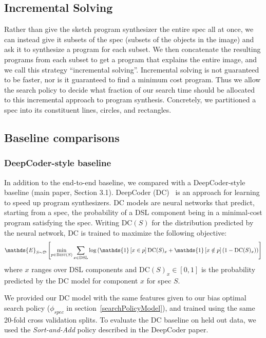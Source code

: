 \documentclass{article}
\newcommand{\indicator}{\mathds{1}} %
\newcommand{\expect}{\mathds{E}} %
\begin{document}
\subsection{Incremental Solving}
Rather than give the sketch program synthesizer the entire spec all at once,
we can instead give it subsets of the spec (subsets of the objects in the image)
and ask it to synthesize a program for each subset.
We then concatenate the resulting programs from each subset to get a program that explains the entire image,
and we call this strategy ``incremental solving''.
Incremental solving is not guaranteed to be faster,
nor is it guaranteed to find a minimum cost program.
Thus we allow the search policy to decide
what fraction of our search time should be allocated to this incremental approach to program synthesis.
Concretely, we partitioned a spec into its constituent lines, circles, and rectangles.
\subsection{Baseline comparisons}

\subsubsection{DeepCoder-style baseline}

In addition to the end-to-end baseline,
we compared with a DeepCoder-style baseline (main paper, Section 3.1).
DeepCoder (DC)~\cite{BalGauBroetal16}
is an approach for learning to speed up program synthesizers.
DC models are neural networks that
predict, starting from a spec,
the probability of a DSL component being in a minimal-cost program satisfying the spec.
Writing $\text{DC}(S)$ for the distribution predicted by the neural network,
DC is trained to maximize  the following objective:
\begin{equation}
  \expect_{S\sim\mathcal{D}}\left[\min_{p\in \text{\textsc{Best}}(S)} \sum_{x\in \text{DSL}} \log \left(\indicator\left[x\in p \right] \text{DC}(S)_x + \indicator\left[x\notin p \right] (1 - \text{DC}(S)_x)\right)
    \right]
\end{equation}
where $x$ ranges over DSL components and $\text{DC}(S)_x\in \left[0,1 \right]$  is the probability predicted by the DC model for component $x$ for spec $S$.

We provided our DC model with the same features given to our bias optimal search policy ($\phi_{spec}$ in section~\ref{searchPolicyModel}), and trained using the same 20-fold cross validation splits.
To evaluate the DC baseline on held out data,
we used the \emph{Sort-and-Add} policy described in the DeepCoder paper\cite{BalGauBroetal16}.
\end{document}
